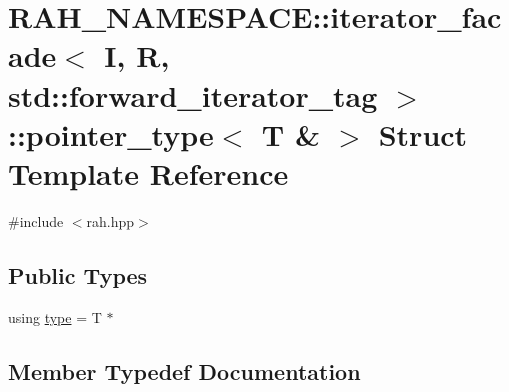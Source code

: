 \hypertarget{struct_r_a_h___n_a_m_e_s_p_a_c_e_1_1iterator__facade_3_01_i_00_01_r_00_01std_1_1forward__iteratoea928274de843ca75854fe11c7a3d72e}{}\section{R\+A\+H\+\_\+\+N\+A\+M\+E\+S\+P\+A\+CE\+::iterator\+\_\+facade$<$ I, R, std\+::forward\+\_\+iterator\+\_\+tag $>$\+::pointer\+\_\+type$<$ T \& $>$ Struct Template Reference}
\label{struct_r_a_h___n_a_m_e_s_p_a_c_e_1_1iterator__facade_3_01_i_00_01_r_00_01std_1_1forward__iteratoea928274de843ca75854fe11c7a3d72e}


{\ttfamily \#include $<$rah.\+hpp$>$}

\subsection*{Public Types}
\begin{DoxyCompactItemize}
\item 
using \mbox{\hyperlink{struct_r_a_h___n_a_m_e_s_p_a_c_e_1_1iterator__facade_3_01_i_00_01_r_00_01std_1_1forward__iteratoea928274de843ca75854fe11c7a3d72e_ae22b60421f07225c791125987b870d8f}{type}} = T $\ast$
\end{DoxyCompactItemize}


\subsection{Member Typedef Documentation}
\mbox{\label{struct_r_a_h___n_a_m_e_s_p_a_c_e_1_1iterator__facade_3_01_i_00_01_r_00_01std_1_1forward__iteratoea928274de843ca75854fe11c7a3d72e_ae22b60421f07225c791125987b870d8f}} 
